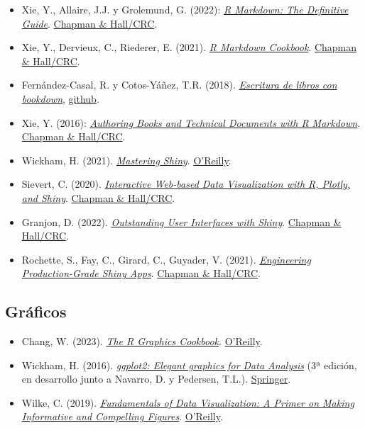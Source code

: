 \documentclass[
]{book}
\theoremstyle{break}
\theoremstyle{nonumberplain}
\begin{document}
\begin{itemize}
\item
  Xie, Y., Allaire, J.J. y Grolemund, G. (2022): \emph{\href{https://bookdown.org/yihui/rmarkdown/}{R Markdown: The Definitive Guide}}. \href{https://www.crcpress.com/p/book/9781138359338}{Chapman \& Hall/CRC}.
\item
  Xie, Y., Dervieux, C., Riederer, E. (2021). \emph{\href{https://bookdown.org/yihui/rmarkdown-cookbook/}{R Markdown Cookbook}}. \href{https://www.routledge.com/p/book/9780367563837}{Chapman \& Hall/CRC}.
\item
  Fernández-Casal, R. y Cotos-Yáñez, T.R. (2018). \emph{\href{https://rubenfcasal.github.io/bookdown_intro}{Escritura de libros con bookdown}}, \href{https://github.com/rubenfcasal/bookdown_intro}{github}.
\item
  Xie, Y. (2016): \emph{\href{https://bookdown.org/yihui/bookdown/}{Authoring Books and Technical Documents with R Markdown}}. \href{https://www.routledge.com/p/book/9781138700109}{Chapman \& Hall/CRC}.
\item
  Wickham, H. (2021). \emph{\href{https://mastering-shiny.org/}{Mastering Shiny}}. \href{https://www.oreilly.com/library/view/mastering-shiny/9781492047377}{O'Reilly}.
\item
  Sievert, C. (2020). \emph{\href{https://plotly-r.com/}{Interactive Web-based Data Visualization with R, Plotly, and Shiny}}. \href{https://www.routledge.com/p/book/9781138331457}{Chapman \& Hall/CRC}.
\item
  Granjon, D. (2022). \emph{\href{https://unleash-shiny.rinterface.com/}{Outstanding User Interfaces with Shiny}}. \href{https://www.routledge.com/p/book/9780367643652}{Chapman \& Hall/CRC}.
\item
  Rochette, S., Fay, C., Girard, C., Guyader, V. (2021). \emph{\href{https://engineering-shiny.org/}{Engineering Production-Grade Shiny Apps}}. \href{https://www.routledge.com/p/book/9780367466022}{Chapman \& Hall/CRC}.
\end{itemize}

\subsection*{Gráficos}\label{gruxe1ficos-1}

\begin{itemize}
\item
  Chang, W. (2023). \emph{\href{https://r-graphics.org}{The R Graphics Cookbook}}. \href{https://www.amazon.com/dp/1491978600}{O'Reilly}.
\item
  Wickham, H. (2016). \emph{\href{https://ggplot2-book.org}{ggplot2: Elegant graphics for Data Analysis}} (3ª edición, en desarrollo junto a Navarro, D. y Pedersen, T.L.). \href{https://www.amazon.com/gp/product/331924275X}{Springer}.
\item
  Wilke, C. (2019). \emph{\href{https://clauswilke.com/dataviz/}{Fundamentals of Data Visualization: A Primer on Making Informative and Compelling Figures}}. \href{https://www.oreilly.com/library/view/fundamentals-of-data/9781492031079}{O'Reilly}.
\end{itemize}
\end{document}
